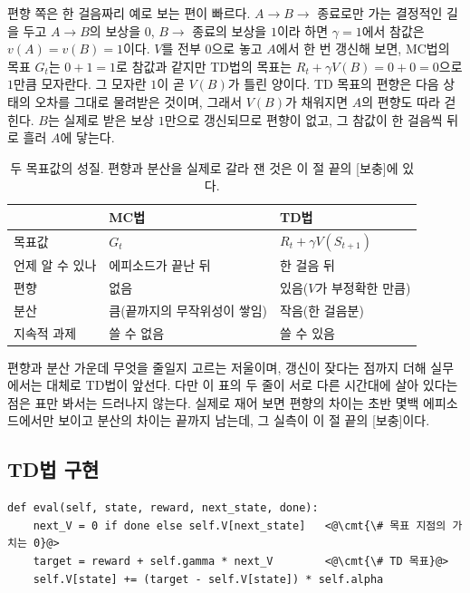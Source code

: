 \documentclass[11pt,a4paper]{article}
\newcommand{\cmt}[1]{\textcolor{codecm}{#1}}   %
\begin{document}
편향 쪽은 한 걸음짜리 예로 보는 편이 빠르다. $A \to B \to$ 종료로만 가는 결정적인 길을 두고
$A \to B$의 보상을 $0$, $B \to$ 종료의 보상을 $1$이라 하면 $\gamma=1$에서 참값은
$v(A)=v(B)=1$이다. $V$를 전부 $0$으로 놓고 $A$에서 한 번 갱신해 보면, MC법의 목표 $G_t$는
$0+1=1$로 참값과 같지만 TD법의 목표는 $R_t + \gamma V(B) = 0 + 0 = 0$으로 $1$만큼 모자란다. 그
모자란 $1$이 곧 $V(B)$가 틀린 양이다. TD 목표의 편향은 다음 상태의 오차를 그대로 물려받은 것이며,
그래서 $V(B)$가 채워지면 $A$의 편향도 따라 걷힌다. $B$는 실제로 받은 보상 $1$만으로 갱신되므로
편향이 없고, 그 참값이 한 걸음씩 뒤로 흘러 $A$에 닿는다.

\begin{table}[htbp]
\centering
\caption{두 목표값의 성질. 편향과 분산을 실제로 갈라 잰 것은 이 절 끝의 [보충]에 있다.}
\label{tab:mc-td}
\small
\begin{tabular}{@{}lll@{}}
\toprule
 & MC법 & TD법 \\
\midrule
목표값        & $G_t$                        & $R_t + \gamma V(S_{t+1})$ \\
언제 알 수 있나 & 에피소드가 끝난 뒤            & 한 걸음 뒤 \\
편향          & 없음                          & 있음($V$가 부정확한 만큼) \\
분산          & 큼(끝까지의 무작위성이 쌓임)    & 작음(한 걸음분) \\
지속적 과제    & 쓸 수 없음                    & 쓸 수 있음 \\
\bottomrule
\end{tabular}
\end{table}

편향과 분산 가운데 무엇을 줄일지 고르는 저울이며, 갱신이 잦다는 점까지 더해 실무에서는 대체로
TD법이 앞선다. 다만 이 표의 두 줄이 서로 다른 시간대에 살아 있다는 점은 표만 봐서는 드러나지
않는다. 실제로 재어 보면 편향의 차이는 초반 몇백 에피소드에서만 보이고 분산의 차이는 끝까지 남는데,
그 실측이 이 절 끝의 [보충]이다.

\subsection{TD법 구현}
\label{sec:td-impl}

\begin{lstlisting}[caption={TD 정책 평가 (\texttt{s01\_td\_eval.py}), $\alpha=0.01$},label={lst:td-eval}]
def eval(self, state, reward, next_state, done):
    next_V = 0 if done else self.V[next_state]   <@\cmt{\# 목표 지점의 가치는 0}@>
    target = reward + self.gamma * next_V        <@\cmt{\# TD 목표}@>
    self.V[state] += (target - self.V[state]) * self.alpha
\end{lstlisting}
\end{document}

